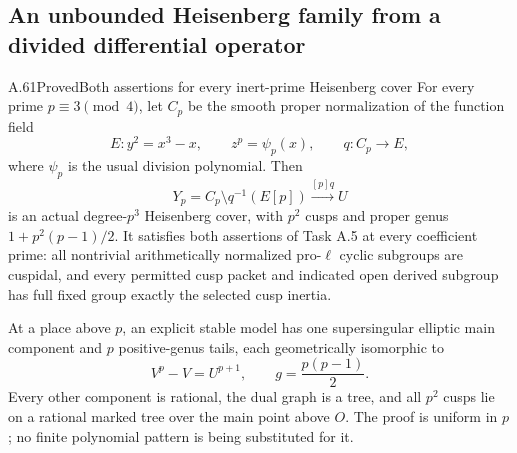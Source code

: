 \subsection{An unbounded Heisenberg family from a divided differential operator}

\begin{statement}{A.61}{Proved}{Both assertions for every inert-prime Heisenberg cover}
For every prime \(p\equiv3\pmod4\), let \(C_p\) be the
smooth proper normalization of the function field
\[
 E:y^2=x^3-x,\qquad z^p=\psi_p(x),
 \qquad q:C_p\longrightarrow E,
                                                        \tag{A.61.1}
\]
where \(\psi_p\) is the usual division polynomial. Then
\[
 Y_p=C_p\setminus q^{-1}(E[p])
           \xrightarrow{[p]q}U
                                                        \tag{A.61.2}
\]
is an actual degree-\(p^3\) Heisenberg cover, with
\(p^2\) cusps and proper genus
\(1+p^2(p-1)/2\). It satisfies both assertions of
Task A.5 at every coefficient prime: all nontrivial
arithmetically normalized pro-\(\ell\) cyclic subgroups are
cuspidal, and every permitted cusp packet and indicated
open derived subgroup has full fixed group exactly
the selected cusp inertia.

At a place above \(p\), an explicit stable model has
one supersingular elliptic main component and \(p\)
positive-genus tails, each geometrically isomorphic to
\[
                         V^p-V=U^{p+1},
 \qquad g=\frac{p(p-1)}2.                              \tag{A.61.3}
\]
Every other component is rational, the dual graph is
a tree, and all \(p^2\) cusps lie on a rational marked
tree over the main point above \(O\). The proof is
uniform in \(p\); no finite polynomial pattern is
being substituted for it.
\end{statement}

